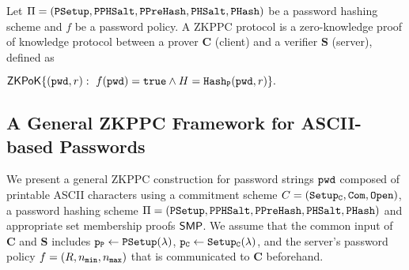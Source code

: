 \begin{definition}[ZKPPC]\label{def:pocopas}
Let $\Pi=(\mathtt{PSetup},\allowbreak\mathtt{PPHSalt},\allowbreak\mathtt{PPreHash},\mathtt{PHSalt},\allowbreak\mathtt{PHash})$ be a password hashing scheme and $f$ be a password policy. A ZKPPC protocol is a zero-knowledge proof of knowledge protocol between a prover $\bm{C}$ (client) and a verifier $\bm{S}$ (server), defined as
\begin{center}$\mathsf{ZKPoK}\{(\mathtt{pwd},r):~f(\mathtt{pwd})=\mathtt{true} \wedge H=\mathtt{Hash_P}(\mathtt{pwd},r)\}.$\end{center}
\end{definition}


\subsection{A General ZKPPC Framework for ASCII-based Passwords} \label{sec:genconstruction}
We present a general ZKPPC construction for password strings $\mathtt{pwd}$ composed of printable ASCII characters using a commitment scheme $C=(\mathtt{Setup_C},\mathtt{Com},\mathtt{Open})$, a password hashing scheme $\Pi=(\mathtt{PSetup},\mathtt{PPHSalt},\allowbreak\mathtt{PPreHash},\allowbreak\mathtt{PHSalt},\allowbreak\mathtt{PHash})$ and appropriate set membership proofs $\mathsf{SMP}$. We assume that the common input of $\bm{C}$ and $\bm{S}$ includes $\mathtt{p_P}\gets\mathtt{PSetup}(\lambda)$, $\mathtt{p_C}\gets\mathtt{Setup_C}(\lambda)$, and the server's password policy $f=(R, {n_\mathtt{min}}, {n_\mathtt{max}})$ that is communicated to $\bm{C}$ beforehand.

